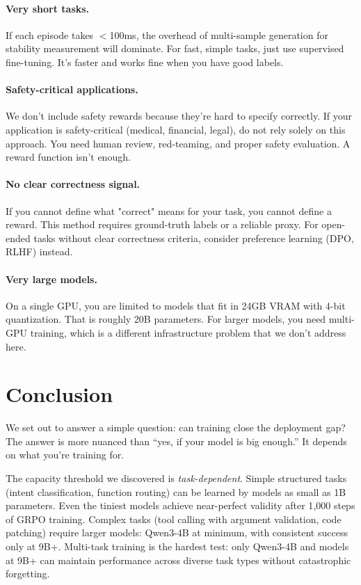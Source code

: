 \documentclass[11pt]{article}
\begin{document}
\paragraph{Very short tasks.}
If each episode takes $<$100ms, the overhead of multi-sample generation for stability measurement will dominate.
For fast, simple tasks, just use supervised fine-tuning.  It's faster and works fine when you have good labels.

\paragraph{Safety-critical applications.}
We don't include safety rewards because they're hard to specify correctly.
If your application is safety-critical (medical, financial, legal), do not rely solely on this approach.
You need human review, red-teaming, and proper safety evaluation.  A reward function isn't enough.

\paragraph{No clear correctness signal.}
If you cannot define what "correct" means for your task, you cannot define a reward.
This method requires ground-truth labels or a reliable proxy.
For open-ended tasks without clear correctness criteria, consider preference learning (DPO, RLHF) instead.

\paragraph{Very large models.}
On a single GPU, you are limited to models that fit in 24GB VRAM with 4-bit quantization.
That is roughly 20B parameters.
For larger models, you need multi-GPU training, which is a different infrastructure problem that we don't address here.

\section{Conclusion}

We set out to answer a simple question: can training close the deployment gap? The answer is more nuanced than ``yes, if your model is big enough.'' It depends on what you're training for.

The capacity threshold we discovered is \emph{task-dependent}.  Simple structured tasks (intent classification, function routing) can be learned by models as small as 1B parameters.  Even the tiniest models achieve near-perfect validity after 1{,}000 steps of GRPO training.  Complex tasks (tool calling with argument validation, code patching) require larger models: Qwen3-4B at minimum, with consistent success only at 9B+.  Multi-task training is the hardest test: only Qwen3-4B and models at 9B+ can maintain performance across diverse task types without catastrophic forgetting.
\end{document}
